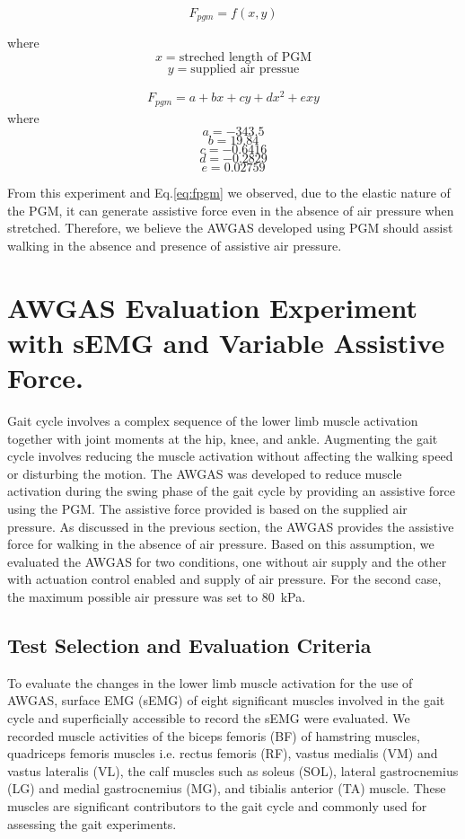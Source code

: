 \documentclass[paper,JRM,paper]{jaciiiarticle}
\begin{document}
\[F_{pgm} = f(x,y)\]

where
\[x = \text{streched length of PGM}\] 
\[y = \text{supplied air pressue}\]

\begin{align}\label{eq:fpgm}
	F_{pgm} = a +bx+cy+dx^2+exy
\end{align}
where
\[a = -343.5\]
\[b=19.84\]
\[c = -0.6416\]
\[d = -0.2829\]
\[e = 0.02759\]

From this experiment and Eq.\ref{eq:fpgm} we observed, due to the elastic nature of the PGM, it can generate assistive force even in the absence of air pressure when stretched. Therefore, we believe the AWGAS developed using PGM should assist walking in the absence and presence of assistive air pressure.



\section{AWGAS Evaluation Experiment with sEMG and Variable Assistive Force.}

Gait cycle involves a complex sequence of the lower limb muscle activation together with joint moments at the hip, knee, and ankle. Augmenting the gait cycle involves reducing the muscle activation without affecting the walking speed or disturbing the motion. The AWGAS was developed to reduce muscle activation during the swing phase of the gait cycle by providing an assistive force using the PGM. The assistive force provided is based on the supplied air pressure. As discussed in the previous section, the AWGAS provides the assistive force for walking in the absence of air pressure. Based on this assumption, we evaluated the AWGAS for two conditions, one without air supply and the other with actuation control enabled and supply of air pressure. For the second case, the maximum possible air pressure was set to \SI{80}{\kilo\pascal}.

\subsection{Test Selection and Evaluation Criteria}
To evaluate the changes in the lower limb muscle activation for the use of AWGAS, surface EMG (sEMG) of eight significant muscles involved in the gait cycle and superficially accessible to record the sEMG were evaluated. We recorded muscle activities of the biceps femoris (BF) of hamstring muscles, quadriceps femoris muscles i.e. rectus femoris (RF), vastus medialis (VM) and vastus lateralis (VL), the calf muscles such as soleus (SOL), lateral gastrocnemius (LG) and medial gastrocnemius (MG), and tibialis anterior (TA) muscle. These muscles are significant contributors to the gait cycle and commonly used for assessing the gait experiments. 
\end{document}
